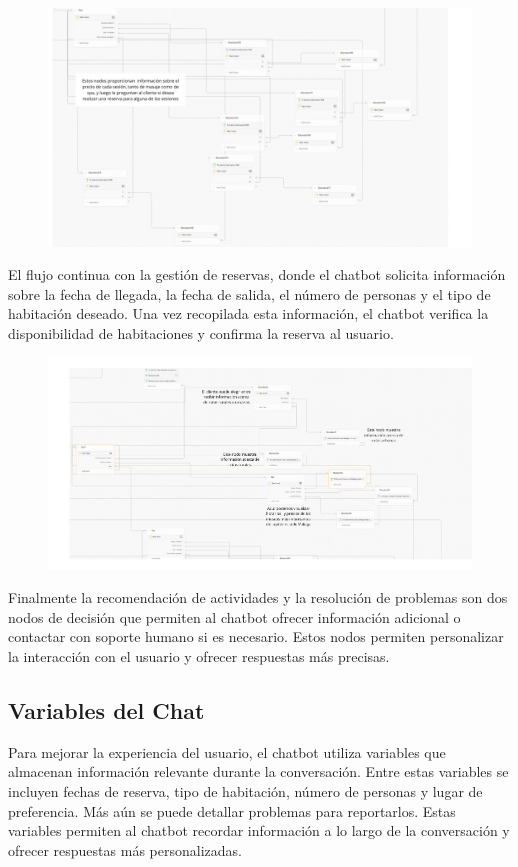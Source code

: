 \documentclass[12pt]{article}
\begin{document}
\clearpage

\begin{figure}[h!]
    \centering
    \includegraphics[width=.5\textwidth]{assets/workflow2.jpeg}
    \label{fig:my_label}
\end{figure}

El flujo continua con la gestión de reservas, donde el chatbot solicita información sobre la fecha de llegada, la fecha de salida, el número de personas
y el tipo de habitación deseado. Una vez recopilada esta información, el chatbot verifica la disponibilidad de habitaciones y confirma la reserva al usuario.

\begin{figure}[h!]
    \centering
    \includegraphics[width=.5\textwidth]{assets/workflow3.jpeg}
    \label{fig:my_label}
\end{figure}

Finalmente la recomendación de actividades y la resolución de problemas son dos nodos de decisión que permiten al chatbot ofrecer información adicional
o contactar con soporte humano si es necesario. Estos nodos permiten personalizar la interacción con el usuario y ofrecer respuestas más precisas.

\subsection{Variables del Chat}

Para mejorar la experiencia del usuario, el chatbot utiliza variables que almacenan información relevante durante la conversación. 
Entre estas variables se incluyen fechas de reserva, tipo de habitación, número de personas y lugar de preferencia. Más aún se puede
detallar problemas para reportarlos. Estas variables permiten al chatbot recordar información a lo largo de la conversación y ofrecer 
respuestas más personalizadas.
\end{document}
